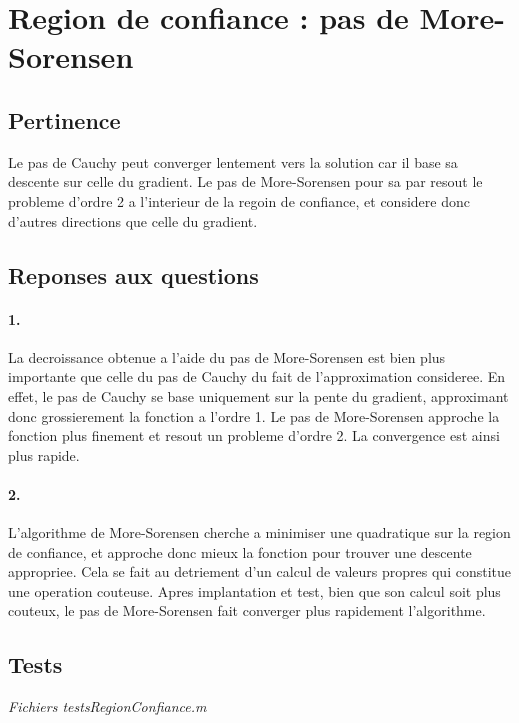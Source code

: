 \documentclass[12pt]{article}
\begin{document}
\section{Region de confiance : pas de More-Sorensen}
\subsection{Pertinence}
Le pas de Cauchy peut converger lentement vers la solution car il base sa descente sur celle du gradient. Le pas de More-Sorensen pour sa par resout le probleme d'ordre 2 a l'interieur de la regoin de confiance, et considere donc d'autres directions que celle du gradient.

\subsection{Reponses aux questions}
\paragraph{1.}
La decroissance obtenue a l'aide du pas de More-Sorensen est bien plus importante que celle du pas de Cauchy du fait de l'approximation consideree. En effet, le pas de Cauchy se base uniquement sur la pente du gradient, approximant donc grossierement la fonction a l'ordre 1. Le pas de More-Sorensen approche la fonction plus finement et resout un probleme d'ordre 2. La convergence est ainsi plus rapide.

\paragraph{2.}
L'algorithme de More-Sorensen cherche a minimiser une quadratique sur la region de confiance, et approche donc mieux la fonction pour trouver une descente appropriee. Cela se fait au detriement d'un calcul de valeurs propres qui constitue une operation couteuse.\newline
Apres implantation et test, bien que son calcul soit plus couteux, le pas de More-Sorensen fait converger plus rapidement l'algorithme.

\subsection{Tests}
\begin{flushright}
\textit{Fichiers testsRegionConfiance.m}
\end{flushright}
\end{document}
